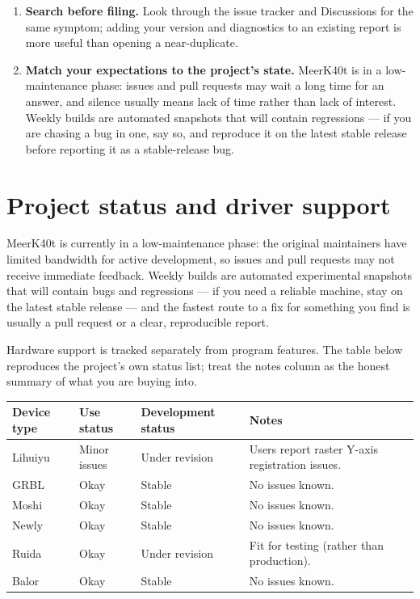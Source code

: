 \begin{enumerate}[label=\arabic*.,leftmargin=1.6em]
        , the operation's speed and power) and whether the
        problem repeats on a second attempt. State what you expected to happen
        as well as what did.
  \item \textbf{Search before filing.} Look through the issue tracker and
        Discussions for the same symptom; adding your version and diagnostics to
        an existing report is more useful than opening a near-duplicate.
  \item \textbf{Match your expectations to the project's state.} MeerK40t is in
        a low-maintenance phase: issues and pull requests may wait a long time
        for an answer, and silence usually means lack of time rather than lack of
        interest. Weekly builds are automated snapshots that will contain
        regressions --- if you are chasing a bug in one, say so, and reproduce it
        on the latest stable release before reporting it as a stable-release bug.
\end{enumerate}

\section*{Project status and driver support}

MeerK40t is currently in a low-maintenance phase: the original maintainers have
limited bandwidth for active development, so issues and pull requests may not
receive immediate feedback. Weekly builds are automated experimental snapshots
that will contain bugs and regressions --- if you need a reliable machine, stay
on the latest stable release --- and the fastest route to a fix for something you
find is usually a pull request or a clear, reproducible report.

Hardware support is tracked separately from program features. The table below
reproduces the project's own status list; treat the notes column as the honest
summary of what you are buying into.

\begin{center}\small
\begin{tabular}{@{}p{2.0cm}p{2.6cm}p{2.9cm}p{6.1cm}@{}}
\toprule
\textbf{Device type} & \textbf{Use status} & \textbf{Development status} &
\textbf{Notes} \\
\midrule
Lihuiyu & Minor issues & Under revision & Users report raster Y-axis
registration issues. \\
GRBL & Okay & Stable & No issues known. \\
Moshi & Okay & Stable & No issues known. \\
Newly & Okay & Stable & No issues known. \\
Ruida & Okay & Under revision & Fit for testing (rather than production). \\
Balor & Okay & Stable & No issues known. \\
\bottomrule
\end{tabular}
\end{center}

